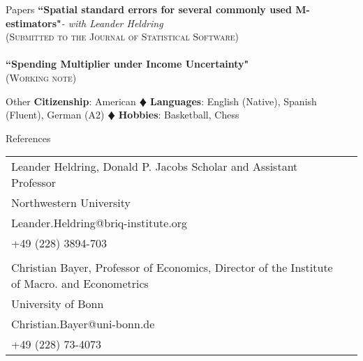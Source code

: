 \documentclass{resume}[10pt] %
\begin{document}
\begin{rSection}{Papers} 
\textbf{``Spatial standard errors for several commonly used M-estimators"}\textit{- with Leander Heldring} \\ (\textsc{Submitted to the Journal of Statistical Software}) \\
\\
\textbf{``Spending Multiplier under Income Uncertainty"} \\(\textsc{Working note})\\
\end{rSection}


\footnotesize
\begin{rSection}{Other} 
\textbf{Citizenship}: American $\vardiamondsuit$ \textbf{Languages}: English (Native), Spanish (Fluent), German (A2) $\vardiamondsuit$ \textbf{Hobbies}: Basketball, Chess 
\end{rSection}
\normalsize
\normalsize
\begin{rSection}{References}
\begin{tabular}{lr}
    Leander Heldring, Donald P. Jacobs Scholar and Assistant Professor    \\ 
    Northwestern University \\
Leander.Heldring@briq-institute.org \\ 
+49 (228) 3894-703 \\
\\
 Christian Bayer, Professor of Economics, Director of the Institute of Macro. and Econometrics   \\
 University of Bonn \\
  Christian.Bayer@uni-bonn.de \\
    +49 (228) 73-4073 \\ 
\end{tabular} 

\end{rSection}
\end{document}
